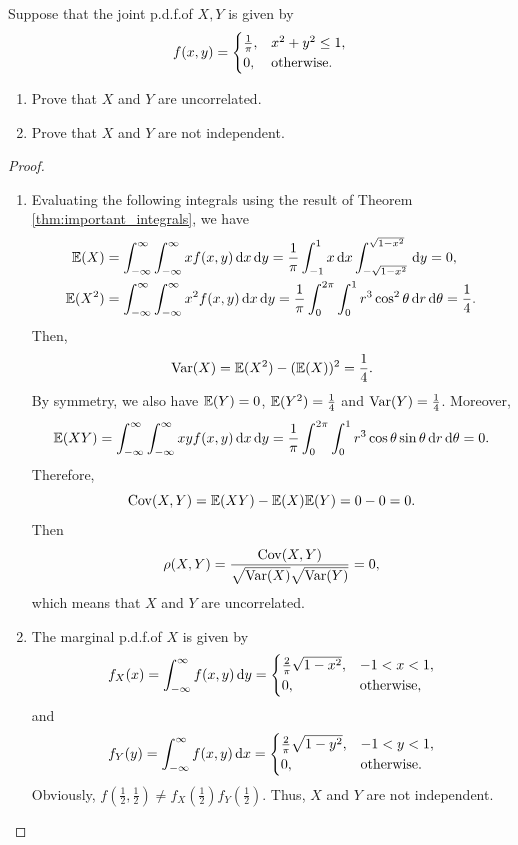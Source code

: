 \begin{example}
  Suppose that the joint p.d.f.\@ of \(X, Y\) is given by
  \[
    f(x, y) = \begin{cases}
      \frac{1}{\mathrm{\pi}}, & x^2 + y^2 \leq 1, \\
      0, & \text{otherwise}.
    \end{cases}
  \]
  \begin{enumerate}
    \item Prove that \(X\) and \(Y\) are uncorrelated.
    \item Prove that \(X\) and \(Y\) are not independent.
  \end{enumerate}
\end{example}
\begin{proof}
  \begin{enumerate}
    \item Evaluating the following integrals using the result of Theorem \ref{thm:important_integrals}, we have
    \begin{align*}
      \mathbb{E}(X) &= \int_{-\infty}^\infty \int_{-\infty}^\infty x f(x, y) \, \mathrm{d} x \, \mathrm{d} y = \frac{1}{\mathrm{\pi}} \int_{-1}^1 x \, \mathrm{d} x \int_{-\sqrt{1 - x^2}}^{\sqrt{1 - x^2}} \, \mathrm{d} y = 0, \\
      \mathbb{E}(X^2) &= \int_{-\infty}^\infty \int_{-\infty}^\infty x^2 f(x, y) \, \mathrm{d} x \, \mathrm{d} y = \frac{1}{\mathrm{\pi}} \int_{0}^{2\mathrm{\pi}} \int_{0}^{1} r^3 \cos^2 \theta \, \mathrm{d} r \, \mathrm{d}\theta = \frac{1}{4}.
    \end{align*}
    Then,
    \[
      \mathrm{Var}(X) = \mathbb{E}(X^2) - (\mathbb{E}(X))^2 = \frac{1}{4}.
    \]
    By symmetry, we also have \(\mathbb{E}(Y) = 0\), \(\mathbb{E}(Y^2) = \frac{1}{4}\) and \(\mathrm{Var}(Y) = \frac{1}{4}\). Moreover,
    \[
      \mathbb{E}(XY) = \int_{-\infty}^\infty \int_{-\infty}^\infty xy f(x, y) \, \mathrm{d} x \, \mathrm{d} y = \frac{1}{\mathrm{\pi}} \int_{0}^{2\mathrm{\pi}} \int_{0}^{1} r^3 \cos \theta \sin \theta \, \mathrm{d} r \, \mathrm{d}\theta = 0.
    \]
    Therefore,
    \[
      \mathrm{Cov}(X, Y) = \mathbb{E}(XY) - \mathbb{E}(X) \mathbb{E}(Y) = 0 - 0 = 0.
    \]
    Then
    \[
      \rho(X, Y) = \frac{\mathrm{Cov}(X, Y)}{\sqrt{\mathrm{Var}(X)} \sqrt{\mathrm{Var}(Y)}} = 0,
    \]
    which means that \(X\) and \(Y\) are uncorrelated.
    \item The marginal p.d.f.\@ of \(X\) is given by
    \[
      f_X(x) = \int_{-\infty}^\infty f(x, y) \, \mathrm{d} y = \begin{cases}
        \frac{2}{\mathrm{\pi}}\sqrt{1 - x^2}, & -1 < x < 1, \\
        0, & \text{otherwise},
      \end{cases}
    \]
    and
    \[
      f_Y(y) = \int_{-\infty}^\infty f(x, y) \, \mathrm{d} x = \begin{cases}
        \frac{2}{\mathrm{\pi}}\sqrt{1 - y^2}, & -1 < y < 1, \\
        0, & \text{otherwise}.
      \end{cases}
    \]
    Obviously, \(f(\frac{1}{2}, \frac{1}{2}) \neq f_X(\frac{1}{2}) f_Y(\frac{1}{2})\). Thus, \(X\) and \(Y\) are not independent. \qedhere
  \end{enumerate}
\end{proof}

